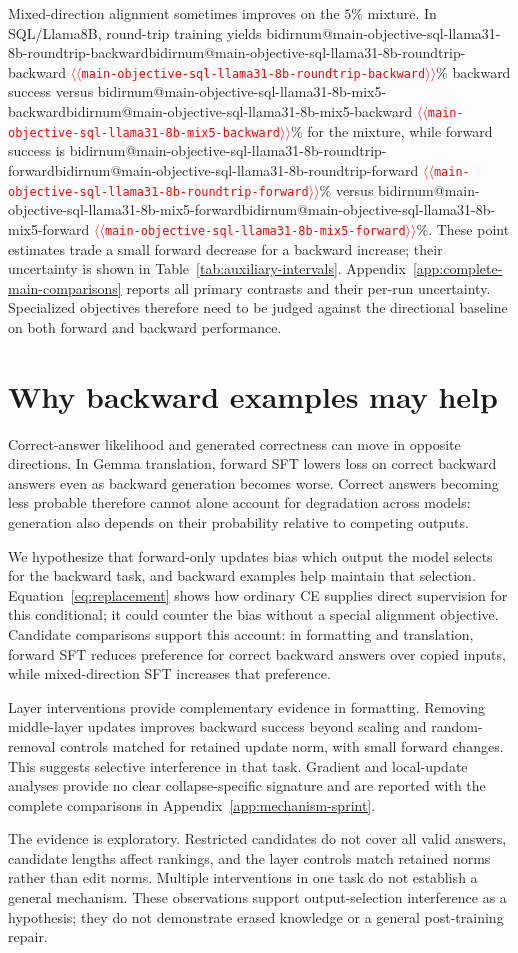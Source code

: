 \documentclass[11pt]{article}
\makeatletter
\providecommand{\NUM}[1]{%
  \ifcsname bidirnum@#1\endcsname\csname bidirnum@#1\endcsname
  \else\textcolor{red}{$\langle\langle$\texttt{#1}$\rangle\rangle$}\fi}
\makeatother
\begin{document}
Mixed-direction alignment sometimes improves on the $5\%$ mixture. In SQL/Llama8B,
round-trip training yields
\NUM{main-objective-sql-llama31-8b-roundtrip-backward}\% backward success versus
\NUM{main-objective-sql-llama31-8b-mix5-backward}\% for the mixture, while forward
success is \NUM{main-objective-sql-llama31-8b-roundtrip-forward}\% versus
\NUM{main-objective-sql-llama31-8b-mix5-forward}\%. These point estimates trade a small
forward decrease for a backward increase; their uncertainty is shown in
Table~\ref{tab:auxiliary-intervals}. Appendix~\ref{app:complete-main-comparisons} reports all primary
contrasts and their per-run uncertainty. Specialized objectives therefore need to be judged
against the directional baseline on both forward and backward performance.

\section{Why backward examples may help}
\label{sec:mechanism}

Correct-answer likelihood and generated correctness can move in opposite directions.
In Gemma translation, forward SFT lowers loss on correct backward answers even as backward
generation becomes worse. Correct answers becoming less probable therefore cannot alone
account for degradation across models: generation also depends on their probability
relative to competing outputs.

We hypothesize that forward-only updates bias which output the model selects for the
backward task, and backward examples help maintain that selection. Equation~\ref{eq:replacement}
shows how ordinary CE supplies direct supervision for this conditional; it could counter
the bias without a special alignment objective. Candidate comparisons support this account:
in formatting and translation, forward SFT reduces preference for correct backward answers
over copied inputs, while mixed-direction SFT increases that preference.

Layer interventions provide complementary evidence in formatting. Removing middle-layer
updates improves backward success beyond scaling and random-removal controls matched for
retained update norm, with small forward changes. This suggests selective interference in
that task. Gradient and local-update analyses provide no clear collapse-specific signature
and are reported with the complete comparisons in Appendix~\ref{app:mechanism-sprint}.

The evidence is exploratory. Restricted candidates do not cover all valid answers, candidate
lengths affect rankings, and the layer controls match retained norms rather than edit norms.
Multiple interventions in one task do not establish a general mechanism. These observations
support output-selection interference as a hypothesis; they do not demonstrate erased
knowledge or a general post-training repair.
\end{document}

